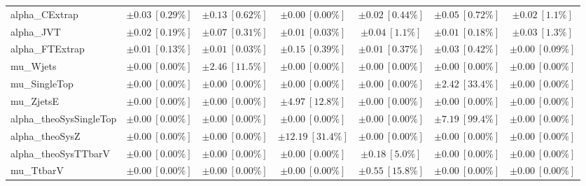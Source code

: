 \begin{sidewaystable}
\begin{center}
\begin{tabular*}{\textwidth}{@{\extracolsep{\fill}}lcccccc}
alpha\_CExtrap         & $\pm 0.03\ [0.29\%] $          & $\pm 0.13\ [0.62\%] $          & $\pm 0.00\ [0.00\%] $          & $\pm 0.02\ [0.44\%] $          & $\pm 0.05\ [0.72\%] $          & $\pm 0.02\ [1.1\%] $       \\
alpha\_JVT         & $\pm 0.02\ [0.19\%] $          & $\pm 0.07\ [0.31\%] $          & $\pm 0.01\ [0.03\%] $          & $\pm 0.04\ [1.1\%] $          & $\pm 0.01\ [0.18\%] $          & $\pm 0.03\ [1.3\%] $       \\
alpha\_FTExtrap         & $\pm 0.01\ [0.13\%] $          & $\pm 0.01\ [0.03\%] $          & $\pm 0.15\ [0.39\%] $          & $\pm 0.01\ [0.37\%] $          & $\pm 0.03\ [0.42\%] $          & $\pm 0.00\ [0.09\%] $       \\
mu\_Wjets         & $\pm 0.00\ [0.00\%] $          & $\pm 2.46\ [11.5\%] $          & $\pm 0.00\ [0.00\%] $          & $\pm 0.00\ [0.00\%] $          & $\pm 0.00\ [0.00\%] $          & $\pm 0.00\ [0.00\%] $       \\
mu\_SingleTop         & $\pm 0.00\ [0.00\%] $          & $\pm 0.00\ [0.00\%] $          & $\pm 0.00\ [0.00\%] $          & $\pm 0.00\ [0.00\%] $          & $\pm 2.42\ [33.4\%] $          & $\pm 0.00\ [0.00\%] $       \\
mu\_ZjetsE         & $\pm 0.00\ [0.00\%] $          & $\pm 0.00\ [0.00\%] $          & $\pm 4.97\ [12.8\%] $          & $\pm 0.00\ [0.00\%] $          & $\pm 0.00\ [0.00\%] $          & $\pm 0.00\ [0.00\%] $       \\
alpha\_theoSysSingleTop         & $\pm 0.00\ [0.00\%] $          & $\pm 0.00\ [0.00\%] $          & $\pm 0.00\ [0.00\%] $          & $\pm 0.00\ [0.00\%] $          & $\pm 7.19\ [99.4\%] $          & $\pm 0.00\ [0.00\%] $       \\
alpha\_theoSysZ         & $\pm 0.00\ [0.00\%] $          & $\pm 0.00\ [0.00\%] $          & $\pm 12.19\ [31.4\%] $          & $\pm 0.00\ [0.00\%] $          & $\pm 0.00\ [0.00\%] $          & $\pm 0.00\ [0.00\%] $       \\
alpha\_theoSysTTbarV         & $\pm 0.00\ [0.00\%] $          & $\pm 0.00\ [0.00\%] $          & $\pm 0.00\ [0.00\%] $          & $\pm 0.18\ [5.0\%] $          & $\pm 0.00\ [0.00\%] $          & $\pm 0.00\ [0.00\%] $       \\
mu\_TtbarV         & $\pm 0.00\ [0.00\%] $          & $\pm 0.00\ [0.00\%] $          & $\pm 0.00\ [0.00\%] $          & $\pm 0.55\ [15.8\%] $          & $\pm 0.00\ [0.00\%] $          & $\pm 0.00\ [0.00\%] $       \\

\end{tabular*}
\end{center}
\end{sidewaystable}
